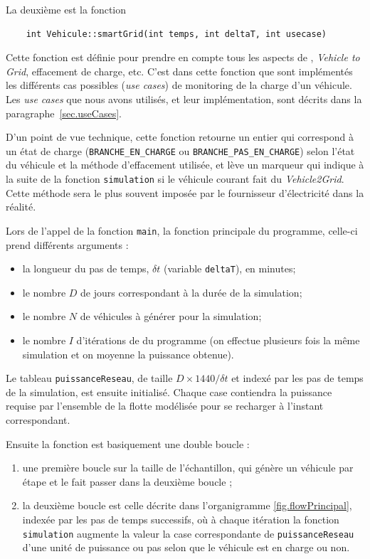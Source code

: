 			La deuxième est la fonction 
			\begin{lstlisting}
    int Vehicule::smartGrid(int temps, int deltaT, int usecase)
            \end{lstlisting}
            Cette fonction est définie pour prendre en compte tous les aspects de \smartgrid{}, \emph{Vehicle to Grid}, effacement de charge, etc. C'est dans cette fonction que sont implémentés les différents cas possibles (\emph{use cases}) de monitoring de la charge d'un véhicule. Les \emph{use cases} que nous avons utilisés, et leur implémentation, sont décrits dans la paragraphe~\vref{sec.useCases}. 
			
			D'un point de vue technique, cette fonction retourne un entier qui correspond à un état de charge (\lstinline{BRANCHE_EN_CHARGE} ou \lstinline{BRANCHE_PAS_EN_CHARGE}) selon l'état du véhicule et la méthode d'effacement utilisée, et lève un marqueur qui indique à la suite de la fonction \lstinline|simulation| si le véhicule courant fait du \emph{Vehicle2Grid}. Cette méthode sera le plus souvent imposée par le fournisseur d’électricité dans la réalité.
			
			\bigskip
			
			Lors de l'appel de la fonction \lstinline{main}, la fonction principale du programme, celle-ci prend différents arguments :
			\begin{itemize}
			\item la longueur du pas de temps, $\delta t$ (variable \lstinline{deltaT}), en minutes;
			\item le nombre $D$ de jours correspondant à la durée de la simulation;
			\item le nombre $N$ de véhicules à générer pour la simulation;
			\item le nombre $I$ d'itérations de du programme (on effectue plusieurs fois la même simulation et on moyenne la puissance obtenue).
			\end{itemize}
			
			Le tableau \lstinline{puissanceReseau}, de taille $D \times 1440 / \delta t$ et indexé par les pas de temps de la simulation, est ensuite initialisé. Chaque case contiendra la puissance requise par l'ensemble de la flotte modélisée pour se recharger à l'instant correspondant.
			
			Ensuite la fonction est basiquement une double boucle :
			\begin{enumerate}
			\item une première boucle sur la taille de l'échantillon, qui génère un véhicule par étape et le fait passer dans la deuxième boucle ;
			\item la deuxième boucle est celle décrite dans l'organigramme \vref{fig.flowPrincipal}, indexée par les pas de temps successifs, où à chaque itération la fonction \lstinline{simulation} augmente la valeur la case correspondante de \lstinline{puissanceReseau} d'une unité de puissance ou pas selon que le véhicule est en charge ou non.
			\end{enumerate}
			
